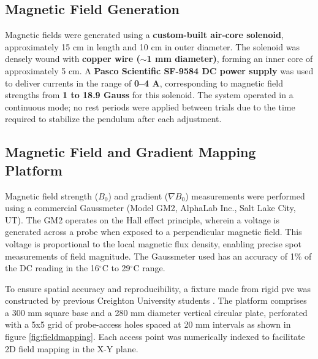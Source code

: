 \subsection*{Magnetic Field Generation}

Magnetic fields were generated using a \textbf{custom-built air-core solenoid}, approximately 15 cm in length and 10 cm in outer diameter. The solenoid was densely wound with \textbf{copper wire ($\sim$1 mm diameter)}, forming an inner core of approximately 5 cm. A \textbf{Pasco Scientific SF-9584 DC power supply} was used to deliver currents in the range of \textbf{0--4 A}, corresponding to magnetic field strengths from \textbf{1 to 18.9 Gauss} for this solenoid. The system operated in a continuous mode; no rest periods were applied between trials due to the time required to stabilize the pendulum after each adjustment. 

\subsection{Magnetic Field and Gradient Mapping Platform}

Magnetic field strength ($B_0$) and gradient ($\nabla B_0$) measurements were performed using a commercial Gaussmeter (Model GM2, AlphaLab Inc., Salt Lake City, UT).  The GM2 operates on the Hall effect principle, wherein a voltage is generated across a probe when exposed to a perpendicular magnetic field. This voltage is proportional to the local magnetic flux density, enabling precise spot measurements of field magnitude. The Gaussmeter used has an accuracy of 1\% of the DC reading in the 16$^\circ$C to 29$^\circ$C range.

To ensure spatial accuracy and reproducibility, a fixture made from rigid \gls{pvc} was constructed by previous Creighton University students \cite{haddixProposal}. The platform comprises a 300 mm square base and a 280 mm diameter vertical circular plate, perforated with a 5x5 grid of probe-access holes spaced at 20 mm intervals as shown in figure \ref{fig:fieldmapping}. Each access point was numerically indexed to facilitate 2D field mapping in the X-Y plane.

